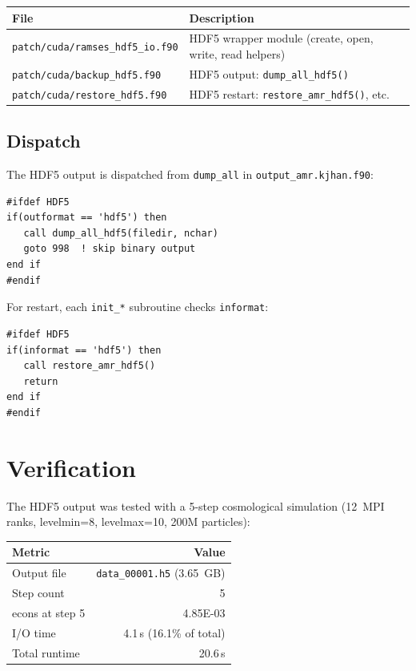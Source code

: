 \documentclass[11pt,fleqn]{book}
\begin{document}
\begin{center}
\begin{tabular}{ll}
\toprule
\textbf{File} & \textbf{Description} \\
\midrule
\texttt{patch/cuda/ramses\_hdf5\_io.f90} & HDF5 wrapper module (create, open, write, read helpers) \\
\texttt{patch/cuda/backup\_hdf5.f90} & HDF5 output: \texttt{dump\_all\_hdf5()} \\
\texttt{patch/cuda/restore\_hdf5.f90} & HDF5 restart: \texttt{restore\_amr\_hdf5()}, etc. \\
\bottomrule
\end{tabular}
\end{center}

\subsection{Dispatch}

The HDF5 output is dispatched from \texttt{dump\_all} in \texttt{output\_amr.kjhan.f90}:

\begin{lstlisting}[style=fortran,numbers=none]
#ifdef HDF5
if(outformat == 'hdf5') then
   call dump_all_hdf5(filedir, nchar)
   goto 998  ! skip binary output
end if
#endif
\end{lstlisting}

For restart, each \texttt{init\_*} subroutine checks \texttt{informat}:

\begin{lstlisting}[style=fortran,numbers=none]
#ifdef HDF5
if(informat == 'hdf5') then
   call restore_amr_hdf5()
   return
end if
#endif
\end{lstlisting}


\section{Verification}

The HDF5 output was tested with a 5-step cosmological simulation (12~MPI ranks, levelmin=8, levelmax=10, 200M particles):

\begin{center}
\begin{tabular}{lr}
\toprule
\textbf{Metric} & \textbf{Value} \\
\midrule
Output file & \texttt{data\_00001.h5} (3.65~GB) \\
Step count & 5 \\
econs at step 5 & 4.85E-03 \\
I/O time & 4.1\,s (16.1\% of total) \\
Total runtime & 20.6\,s \\
\bottomrule
\end{tabular}
\end{center}
\end{document}
